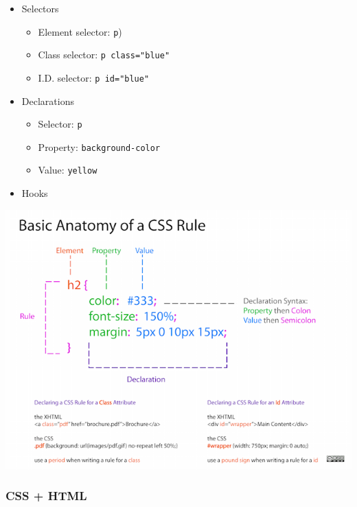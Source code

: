 \documentclass[]{book}
\providecommand{\tightlist}{%
  \setlength{\itemsep}{0pt}\setlength{\parskip}{0pt}}
\begin{document}
\begin{itemize}
\tightlist
\item
  Selectors

  \begin{itemize}
  \tightlist
  \item
    Element selector: \texttt{p})
  \item
    Class selector: \texttt{p\ class="blue"}
  \item
    I.D. selector: \texttt{p\ id="blue"}
  \end{itemize}
\item
  Declarations

  \begin{itemize}
  \tightlist
  \item
    Selector: \texttt{p}
  \item
    Property: \texttt{background-color}
  \item
    Value: \texttt{yellow}
  \end{itemize}
\item
  Hooks
\end{itemize}

\begin{center}\includegraphics[width=0.7\linewidth]{img/css-rule-2} \end{center}

\hypertarget{css-html}{%
\subsubsection{CSS + HTML}\label{css-html}}
\end{document}
